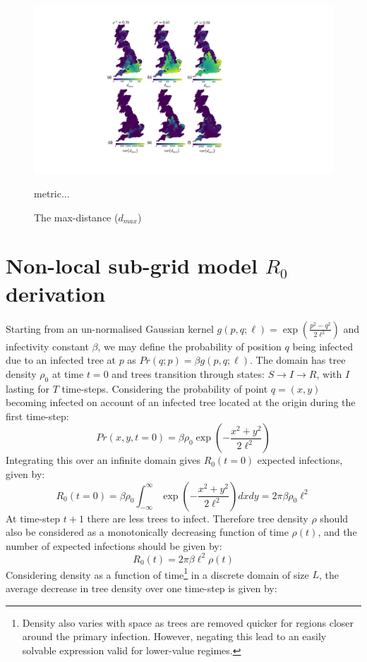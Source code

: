 \begin{figure}
    \centering
    \includegraphics[scale=0.55]{appendix/figures/A-ch4figure1.pdf}
    \caption{The max-distance ($d_{max}$)} metric...
    \label{fig:my_label}
\end{figure}

\blindtext
\blindtext

\chapter{Non-local sub-grid model $R_0$ derivation}
\label{section:apendix_A}

Starting from an un-normalised Gaussian kernel $g(p, q; \ell) = \exp(\frac{p^2-q^2}{2\ell^2})$ and infectivity constant $\beta$, we may define the probability of position $q$ being infected due to an infected tree at $p$ as $Pr(q; p) = \beta g(p, q; \ell)$. The domain has tree density $\rho_0$ at time $t=0$ and trees transition through states: $S\rightarrow I\rightarrow R$, with $I$ lasting for $T$ time-steps. Considering the probability of point $q = (x, y)$ becoming infected on account of an infected tree located at the origin during the first time-step:
\begin{equation}
    Pr(x, y, t=0) = \beta \rho_0 \exp(-\frac{x^2+y^2}{2\ell^2})
\end{equation}{}
 Integrating this over an infinite domain gives $R_0(t=0)$ expected infections, given by:
\begin{equation}
    R_0(t = 0) = \beta \rho_0 \int^{\infty}_{-\infty} \exp(-\frac{x^2+y^2}{2\ell^2})dx dy= 2\pi\beta\rho_0\ell^2
\end{equation}{}
At time-step $t+1$ there are less trees to infect. Therefore tree density $\rho$ should also be considered as a monotonically decreasing function of time $\rho(t)$, and the number of expected infections should be given by:
\begin{equation}
    R_0(t) = 2\pi\beta\ell^2\rho(t)
    \label{eq:r0-A}
\end{equation}{}
 Considering density as a function of time\footnote{Density also varies with space as trees are removed quicker for regions closer around the primary infection. However, negating this lead to an easily solvable expression valid for lower-value regimes.} in a discrete domain of size $L$, the average decrease in tree density over one time-step is given by:

